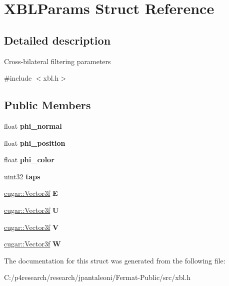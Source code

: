 \hypertarget{struct_x_b_l_params}{}\section{X\+B\+L\+Params Struct Reference}
\label{struct_x_b_l_params}


\subsection{Detailed description}
Cross-\/bilateral filtering parameters 

{\ttfamily \#include $<$xbl.\+h$>$}

\subsection*{Public Members}
\begin{DoxyCompactItemize}
\item 
\mbox{\label{struct_x_b_l_params_aac0ac385f930bcdbce8bf3895b01fc68}} 
float {\bfseries phi\+\_\+normal}
\item 
\mbox{\label{struct_x_b_l_params_aa7b563fbd022004503bbc0ea7f723cb5}} 
float {\bfseries phi\+\_\+position}
\item 
\mbox{\label{struct_x_b_l_params_ad61cc2921897e9de7c5a8d45573b7364}} 
float {\bfseries phi\+\_\+color}
\item 
\mbox{\label{struct_x_b_l_params_aa360477730a6723007f154c9f9a25605}} 
uint32 {\bfseries taps}
\item 
\mbox{\label{struct_x_b_l_params_a3838d6586a81f649b4e087c9cf394f31}} 
\hyperlink{structcugar_1_1_vector}{cugar\+::\+Vector3f} {\bfseries E}
\item 
\mbox{\label{struct_x_b_l_params_a40baa1d749c0a29e409939bf6462af3f}} 
\hyperlink{structcugar_1_1_vector}{cugar\+::\+Vector3f} {\bfseries U}
\item 
\mbox{\label{struct_x_b_l_params_a4f62222c4d1a46a0d8d2ba72c3b1668c}} 
\hyperlink{structcugar_1_1_vector}{cugar\+::\+Vector3f} {\bfseries V}
\item 
\mbox{\label{struct_x_b_l_params_aa192a14c737d0cdc72ef2ea9d22ac64d}} 
\hyperlink{structcugar_1_1_vector}{cugar\+::\+Vector3f} {\bfseries W}
\end{DoxyCompactItemize}


The documentation for this struct was generated from the following file\+:\begin{DoxyCompactItemize}
\item 
C\+:/p4research/research/jpantaleoni/\+Fermat-\/\+Public/src/xbl.\+h\end{DoxyCompactItemize}
